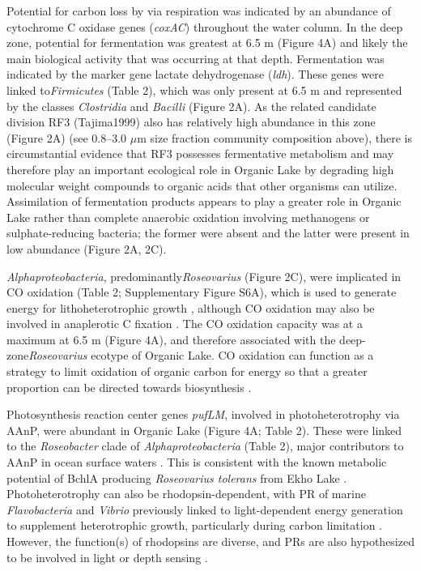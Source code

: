 Potential for carbon loss by via respiration was indicated by an abundance of cytochrome C oxidase genes (\emph{coxAC}) throughout the water column. 
In the deep zone, potential for fermentation was greatest at 6.5 m (Figure 4A) and likely the main biological activity that was occurring at that depth. 
Fermentation was indicated by the marker gene lactate dehydrogenase (\emph{ldh}).
These genes were linked to\emph{Firmicutes} (Table 2), which was only present at 6.5 m and represented by the classes \emph{Clostridia} and \emph{Bacilli} (Figure 2A). 
As the related candidate division RF3 (Tajima1999) also has relatively high abundance in this zone (Figure 2A)
(see 0.8--3.0 $\mu$m size fraction community composition above), %
there is circumstantial evidence that RF3 possesses fermentative metabolism and may therefore play an important ecological role in Organic Lake by degrading high molecular weight compounds to organic acids that other organisms can utilize. 
Assimilation of fermentation products appears to play a greater role in Organic Lake rather than complete anaerobic oxidation involving methanogens or sulphate-reducing bacteria; the former were absent and the latter were present in low abundance (Figure 2A, 2C). 

\emph{Alphaproteobacteria}, predominantly\emph{Roseovarius} (Figure 2C), were implicated in CO oxidation (Table 2; Supplementary Figure S6A), which is used to generate energy for lithoheterotrophic growth \cite{Moran2007b}, although CO oxidation may also be involved in anaplerotic C fixation \cite{Moran2007b}. 
The CO oxidation capacity was at a maximum at 6.5 m (Figure 4A), and therefore associated with the deep-zone\emph{Roseovarius} ecotype of Organic Lake. 
CO oxidation can function as a strategy to limit oxidation of organic carbon for energy so that a greater proportion can be directed towards biosynthesis \cite{Moran2007b}.

Photosynthesis reaction center genes \emph{pufLM}, involved in photoheterotrophy via \ac{AAnP}, were abundant in Organic Lake (Figure 4A; Table 2). 
These were linked to the \emph{Roseobacter} clade of \emph{Alphaproteobacteria} (Table 2), major contributors to \ac{AAnP} in ocean surface waters \cite{Beja2002, Moran2007b}. 
This is consistent with the known metabolic potential of \ac{BchlA} producing \emph{Roseovarius tolerans} from Ekho Lake \cite{Labrenz1999}. 
Photoheterotrophy can also be rhodopsin-dependent, with \ac{PR} of marine \emph{Flavobacteria} and \emph{Vibrio} previously linked to light-dependent energy generation to supplement heterotrophic growth, particularly during carbon limitation \cite{Gomez-Consarnau2007, Gomez-Consarnau2010}. 
However, the function(s) of rhodopsins are diverse, and \acp{PR} are also hypothesized to be involved in light or depth sensing \cite{Fuhrman2008}. 

